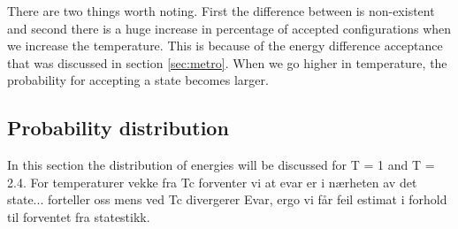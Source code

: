 There are two things worth noting. First the difference between is non-existent and second there is a huge increase in percentage of accepted configurations when we increase the temperature. This is because of the energy difference acceptance that was discussed in section \ref{sec:metro}. When we go higher in temperature, the probability for accepting a state becomes larger.

















\pagebreak
\subsection{Probability distribution}


In this section the distribution of energies will be discussed for T = 1 and T = 2.4. 
For temperaturer vekke fra Tc forventer vi at evar er i nærheten av det state... forteller oss
mens ved Tc divergerer Evar, ergo vi får feil estimat i forhold til forventet fra statestikk. 



